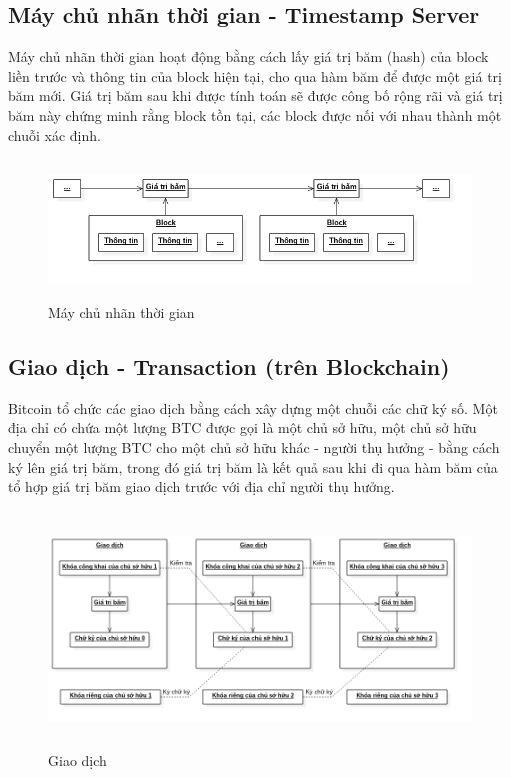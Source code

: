 \subsection{Máy chủ nhãn thời gian - Timestamp Server}
Máy chủ nhãn thời gian hoạt động bằng cách lấy giá trị băm (hash) của block 
liền trước và thông tin của block hiện tại, cho qua hàm băm để được một giá trị 
băm mới. Giá trị băm sau khi được tính toán sẽ được công bố rộng rãi và giá trị 
băm này chứng minh rằng block tồn tại, các block được nối với nhau thành một 
chuỗi xác định.\\
\begin{figure}[h!]
\centering
\includegraphics[height=1.45in, keepaspectratio=true]{timestampserver.png}
\caption{Máy chủ nhãn thời gian}
\end{figure}
\subsection{Giao dịch - Transaction (trên Blockchain)}
Bitcoin tổ chức các giao dịch bằng cách xây dựng một chuỗi các chữ ký số. Một 
địa chỉ có chứa một lượng BTC được gọi là một chủ sở hữu, một chủ sở hữu 
chuyển một lượng BTC cho một chủ sở hữu khác - người thụ hưởng - bằng cách ký 
lên giá trị băm, trong đó giá trị băm là kết quả sau khi đi qua hàm băm
của tổ hợp giá trị băm giao dịch trước với địa chỉ người thụ hưởng.\\
\begin{figure}[h!]
\centering
\includegraphics[height=2.45in, keepaspectratio=true]{transaction.png}
\caption{Giao dịch}
\end{figure}
